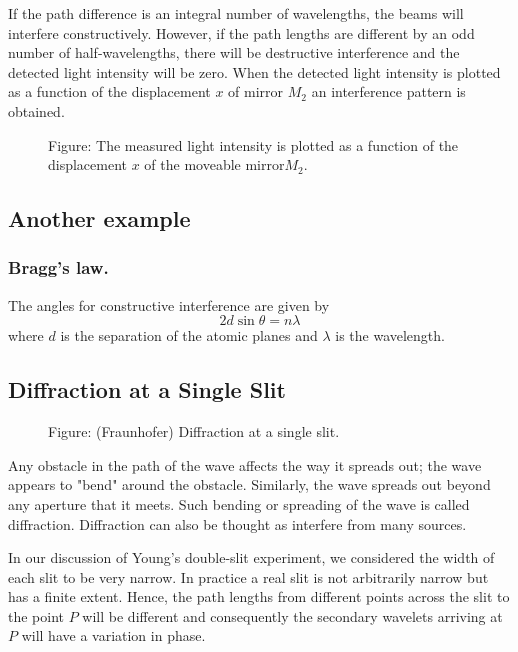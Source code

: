 \documentclass[../../../main.tex]{subfiles}
\begin{document}
If the path difference is an integral number of wavelengths, the beams will interfere constructively. However, if the path lengths are different by an odd number of half-wavelengths, there will be destructive interference and the detected light intensity will be zero. When the detected light intensity is plotted as a function of the displacement $x$ of mirror $M_2$ an interference pattern is obtained.
\begin{figure*}
    \centering
    \caption*{Figure: The measured light intensity is plotted as a function of the displacement $x$ of the moveable mirror$M_2$.}
\end{figure*}

\subsection{Another example}
\subsubsection{Bragg's law.} The angles for constructive interference are given by
\begin{equation*}
    2d \sin \theta = n\lambda
\end{equation*}
where $d$ is the separation of the atomic planes and $\lambda$ is the wavelength. 

\subsection{Diffraction at a Single Slit}
\begin{figure*}
    \centering
    \caption*{Figure: (Fraunhofer) Diffraction at a single slit.}
\end{figure*}
Any obstacle in the path of the wave affects the way it spreads out; the wave appears to "bend" around the obstacle. Similarly, the wave spreads out beyond any aperture that it meets. Such bending or spreading of the wave is called diffraction. Diffraction can also be thought as interfere from many sources.

In our discussion of Young's double-slit experiment, we considered the width of each slit to be very narrow. In practice a real slit is not arbitrarily narrow but has a ﬁnite extent. Hence, the path lengths from different points across the slit to the point $P$ will be different and consequently the secondary wavelets arriving at $P$ will have a variation in phase.
\end{document}
